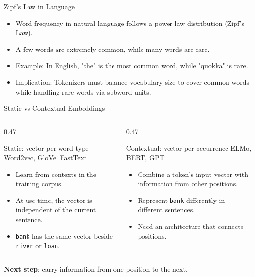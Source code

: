\documentclass[aspectratio=169]{beamer}
\begin{document}
\begin{frame}{Zipf's Law in Language}
  \begin{itemize}
    \item Word frequency in natural language follows a power law distribution (Zipf's Law).
    \item A few words are extremely common, while many words are rare.
    \item Example: In English, "the" is the most common word, while "quokka" is rare.
    \item Implication: Tokenizers must balance vocabulary size to cover common words while handling rare words via subword units.
  \end{itemize}
\end{frame}


\begin{frame}{Static vs Contextual Embeddings}
  \begin{columns}[T,onlytextwidth]
    \begin{column}{0.47\linewidth}
      \begin{block}{Static: vector per word type}
        \small Word2vec, GloVe, FastText
        \begin{itemize}
          \item Learn from contexts in the training corpus.
          \item At use time, the vector is independent of the current sentence.
          \item \texttt{bank} has the same vector beside \texttt{river} or \texttt{loan}.
        \end{itemize}
      \end{block}
    \end{column}
    \begin{column}{0.47\linewidth}
      \begin{block}{Contextual: vector per occurrence}
        \small ELMo, BERT, GPT
        \begin{itemize}
          \item Combine a token's input vector with information from other positions.
          \item Represent \texttt{bank} differently in different sentences.
          \item Need an architecture that connects positions.
        \end{itemize}
      \end{block}
    \end{column}
  \end{columns}
  \vspace{0.5em}
  \textbf{Next step}: carry information from one position to the next.
\end{frame}
\end{document}
